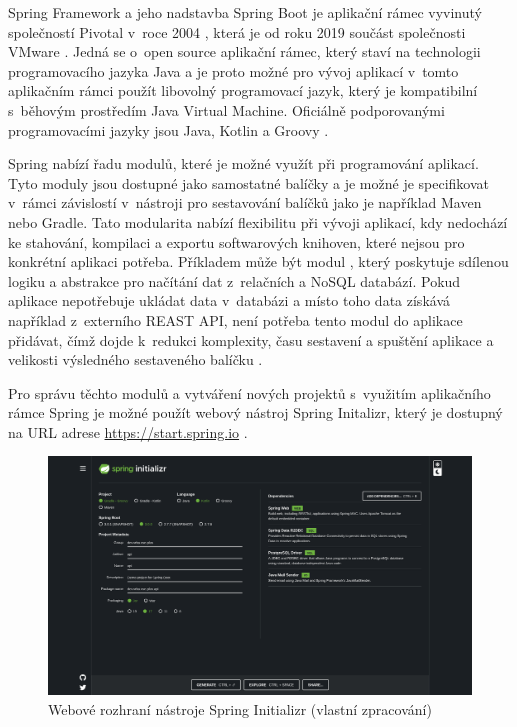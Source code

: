 
Spring Framework a jeho nadstavba Spring Boot je aplikační rámec vyvinutý společností Pivotal v~roce 2004 \cite{risberg_spring_2004}, která je od roku 2019 součást společnosti VMware \cite{vmware_pivotal_acquisition_2019}. Jedná se o~open source aplikační rámec, který staví na technologii programovacího jazyka Java a je proto možné pro vývoj aplikací v~tomto aplikačním rámci použít libovolný programovací jazyk, který je kompatibilní s~běhovým prostředím Java Virtual Machine. Oficiálně podporovanými programovacími jazyky jsou Java, Kotlin a Groovy \cite{spring_framework}.

Spring nabízí řadu modulů, které je možné využít při programování aplikací. Tyto moduly jsou dostupné jako samostatné balíčky a je možné je specifikovat v~rámci závislostí v~nástroji pro sestavování balíčků jako je například Maven nebo Gradle. Tato modularita nabízí flexibilitu při vývoji aplikací, kdy nedochází ke stahování, kompilaci a exportu softwarových knihoven, které nejsou pro konkrétní aplikaci potřeba. Příkladem může být modul , který poskytuje sdílenou logiku a abstrakce pro načítání dat z~relačních a NoSQL databází. Pokud aplikace nepotřebuje ukládat data v~databázi a místo toho data získává například z~externího REAST API, není potřeba tento modul do aplikace přidávat, čímž dojde k~redukci komplexity, času sestavení a spuštění aplikace a velikosti výsledného sestaveného balíčku \cite{spring_boot}.

Pro správu těchto modulů a vytváření nových projektů s~využitím aplikačního rámce Spring je možné použít webový nástroj Spring Initalizr, který je dostupný na URL adrese \url{https://start.spring.io} \cite{spring_boot}.

\begin{figure}[htbp!]\centering
\includegraphics[width=\textwidth]{img/sprint-initializr.png}
\caption{Webové rozhraní nástroje Spring Initializr (vlastní zpracování)}
\label{obr1:SpringInitializr}
\end{figure}

